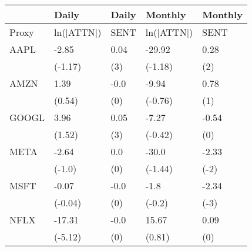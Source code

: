 \begin{tabular}{lllll}
\toprule
{} &       Daily & Daily &     Monthly & Monthly \\
\midrule
Proxy &  ln(|ATTN|) &  SENT &  ln(|ATTN|) &    SENT \\
AAPL  &       -2.85 &  0.04 &      -29.92 &    0.28 \\
      &     (-1.17) &   (3) &     (-1.18) &     (2) \\
AMZN  &        1.39 &  -0.0 &       -9.94 &    0.78 \\
      &      (0.54) &   (0) &     (-0.76) &     (1) \\
GOOGL &        3.96 &  0.05 &       -7.27 &   -0.54 \\
      &      (1.52) &   (3) &     (-0.42) &     (0) \\
META  &       -2.64 &   0.0 &       -30.0 &   -2.33 \\
      &      (-1.0) &   (0) &     (-1.44) &    (-2) \\
MSFT  &       -0.07 &  -0.0 &        -1.8 &   -2.34 \\
      &     (-0.04) &   (0) &      (-0.2) &    (-3) \\
NFLX  &      -17.31 &  -0.0 &       15.67 &    0.09 \\
      &     (-5.12) &   (0) &      (0.81) &     (0) \\
\bottomrule
\end{tabular}
